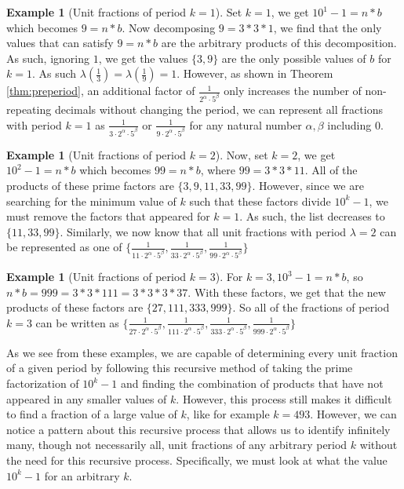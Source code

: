 \documentclass[12pt]{amsart}
\theoremstyle{definition}
\newtheorem{example}[theorem]{Example}
\theoremstyle{remark}
\begin{document}
\begin{example}[Unit fractions of period $k=1$] Set $k=1$, we get $10^1-1=n*b$ which becomes $9=n*b$. Now decomposing $9=3*3*1$, we find that the only values that can satisfy $9=n*b$ are the arbitrary products of this decomposition. As such, ignoring $1$, we get the values $\{3,9\}$ are the only possible values of $b$ for $k=1$. As such $\lambda(\frac{1}{3})=\lambda(\frac{1}{9})=1$. However, as shown in Theorem \ref{thm:preperiod}, an additional factor of $\frac{1}{2^\alpha \cdot5^\beta}$ only increases the number of non-repeating decimals without changing the period, we can represent all fractions with period $k=1$ as $\frac{1}{3\cdot2^\alpha \cdot5^\beta}$ or $\frac{1}{9\cdot2^\alpha \cdot5^\beta}$ for any natural number $\alpha,\beta$ including $0$.
\end{example}

\begin{example}[Unit fractions of period $k=2$] Now, set $k=2$, we get $10^2-1=n*b$ which becomes $99=n*b$, where $99=3*3*11$. All of the products of these prime factors are $\{3,9,11,33,99\}$. However, since we are searching for the minimum value of $k$ such that these factors divide $10^k-1$, we must remove the factors that appeared for $k=1$. As such, the list decreases to $\{11,33,99\}$. Similarly, we now know that all unit fractions with period $\lambda=2$ can be represented as one of $\{\frac{1}{11\cdot2^\alpha \cdot5^\beta},\frac{1}{33\cdot2^\alpha \cdot5^\beta},\frac{1}{99\cdot2^\alpha \cdot5^\beta}\}$
\end{example}

\begin{example}[Unit fractions of period $k=3$] For $k=3, 10^3-1=n*b$, so $n*b=999=3*3*111=3*3*3*37$. With these factors, we get that the new products of these factors are $\{27,111,333,999\}$. So all of the fractions of period $k=3$ can be written as $\{\frac{1}{27\cdot2^\alpha \cdot5^\beta},\frac{1}{111\cdot2^\alpha \cdot5^\beta},\frac{1}{333\cdot2^\alpha \cdot5^\beta},\frac{1}{999\cdot2^\alpha \cdot5^\beta}\}$
\end{example}

As we see from these examples, we are capable of determining every unit fraction of a given period by following this recursive method of taking the prime factorization of $10^k-1$ and finding the combination of products that have not appeared in any smaller values of $k$. However, this process still makes it difficult to find a fraction of a large value of $k$, like for example $k=493$. However, we can notice a pattern about this recursive process that allows us to identify infinitely many, though not necessarily all, unit fractions of any arbitrary period $k$ without the need for this recursive process. Specifically, we must look at what the value $10^k-1$ for an arbitrary $k$.\\
\end{document}
